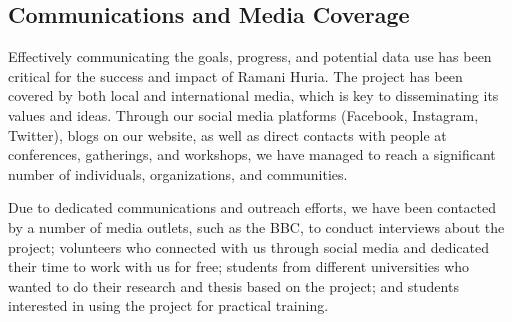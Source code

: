 \documentclass[a4paper,12pt,twoside]{article}
\begin{document}
\subsection{Communications and Media Coverage}
\begin{multicols}{2}
Effectively communicating the goals, progress, and potential data use has been critical for the success and impact of Ramani Huria. The project has been covered by both local and international media, which is key to disseminating its values and ideas. Through our social media platforms (Facebook, Instagram, Twitter), blogs on our website, as well as direct contacts with people at conferences, gatherings, and workshops, we have managed to reach a significant number of individuals, organizations, and communities. 

Due to dedicated communications and outreach efforts, we have been contacted by a number of media outlets, such as the BBC, to conduct interviews about the project; volunteers who connected with us through social media and dedicated their time to work with us for free; students from different universities who wanted to do their research and thesis based on the project; and students interested in using the project for practical training.
\end{multicols}


\end{document}
